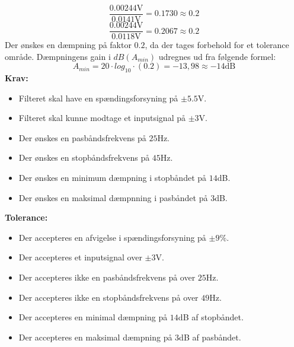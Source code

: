 \begin{equation}
\label{eq:daempningsfaktor}
\dfrac{0.00244\text{V}}{0.0141\text{V}} = 0.1730 \approx 0.2 
\end{equation}
\begin{equation}
\dfrac{0.00244\text{V}}{0.0118\text{V}} = 0.2067  \approx 0.2
\end{equation}
Der ønskes en dæmpning på faktor $0.2$, da der tages forbehold for et tolerance område. Dæmpningens gain i $dB(A_{min})$ udregnes ud fra følgende formel:   
\begin{equation}
\label{eq:daempningsfaktoridB}
A_{min}=20 \cdot log_{10} \cdot (0.2) = -13,98 \approx -14\text{dB}
\end{equation}
\textbf{Krav:}
\begin{itemize}
	\item Filteret skal have en spændingsforsyning på $\pm5.5$V.
	\item Filteret skal kunne modtage et inputsignal på $\pm3$V.
	\item Der ønskes en pasbåndsfrekvens på $25$Hz.
	\item Der ønskes en stopbåndsfrekvens på $45$Hz.
	\item Der ønskes en minimum dæmpning i stopbåndet på $14$dB.
	\item Der ønskes en maksimal dæmpnning i pasbåndet på $3$dB.
\end{itemize}
\noindent \textbf{Tolerance:}
\begin{itemize}
	\item Der accepteres en afvigelse i spændingsforsyning på $\pm9\%$.
	\item Der accepteres et inputsignal over $\pm3$V.
	\item Der accepteres ikke en pasbåndsfrekvens på over $25$Hz.
	\item Der accepteres ikke en stopbåndsfrekvens på over $49$Hz.
	\item Der accepteres en minimal dæmpning på $14$dB af stopbåndet.
	\item Der accepteres en maksimal dæmpning på $3$dB af pasbåndet.
\end{itemize}
